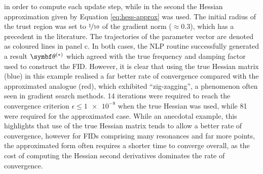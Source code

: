 in order to compute each update step, while in the second the Hessian
approximation given by Equation \ref{eq:hess-approx} was used. The initial
radius of the trust region was set to $\nicefrac{1}{10}$ of the gradient norm
($\approx 0.3$), which has a precedent in the literature\cite{Gould2005}. The
trajectories of the parameter vector are denoted as coloured lines in panel c.
In both cases, the \ac{NLP} routine successfully generated a result $\bthstar$
which agreed with the true frequency and damping factor used to construct the
\ac{FID}. However, it is clear that using the true Hessian matrix (blue) in
this example realised a far better rate of convergence compared with the
approximated analogue (red), which exhibited ``zig-zagging'', a phenomenon
often seen in gradient search methods. 14 iterations were required to reach the
convergence criterion $\epsilon \leq \num[print-unity-mantissa=false]{1e-8}$
when the true Hessian was used, while 81 were required for the approximated
case. While an anecdotal example, this highlights that use of the true
Hessian matrix tends to allow a better rate of convergence, however for
\acp{FID} comprising many resonances and far more points, the approximated form
often requires a shorter time to converge overall, as the cost of computing the
Hessian second derivatives dominates the rate of convergence.
